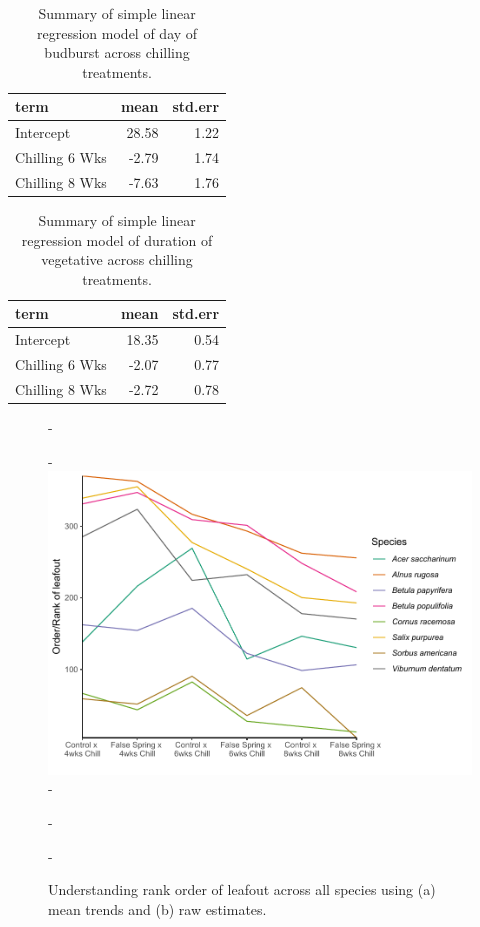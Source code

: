 \documentclass{article}\usepackage[]{graphicx}\usepackage[]{color}
\begin{document}
\begin{table}[H]
\centering
\caption{Summary of simple linear regression model of day of budburst across chilling treatments.} 
\label{tab:simpbb}
\begin{tabular}{lrr}
  \hline
term & mean & std.err \\ 
  \hline
Intercept & 28.58 & 1.22 \\ 
  Chilling 6 Wks & -2.79 & 1.74 \\ 
  Chilling 8 Wks & -7.63 & 1.76 \\ 
   \hline
\end{tabular}
\end{table}
\begin{table}[H]
\centering
\caption{Summary of simple linear regression model of duration of vegetative across chilling treatments.} 
\label{tab:simpdvr}
\begin{tabular}{lrr}
  \hline
term & mean & std.err \\ 
  \hline
Intercept & 18.35 & 0.54 \\ 
  Chilling 6 Wks & -2.07 & 0.77 \\ 
  Chilling 8 Wks & -2.72 & 0.78 \\ 
   \hline
\end{tabular}
\end{table}


  
{\begin{figure} [H]
  -\begin{center}
  -\includegraphics[width=12cm]{..//analyses/figures/budsetorder_byrank.pdf} 
  -\caption{Understanding rank order of leafout across all species using (a) mean trends and (b) raw estimates. }\label{fig:bsetrank}
  -\end{center}
  -\end{figure}}
\end{document}
